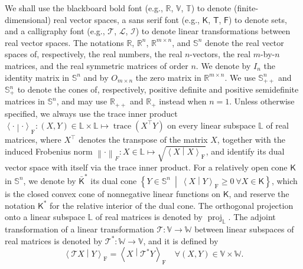 \documentclass[oneside]{amsart}
\theoremstyle{plain}
\theoremstyle{definition}
\theoremstyle{remark}
\numberwithin{equation}{section}
\DeclareMathOperator{\trace}{trace}
\DeclareMathOperator{\proj}{proj}
\begin{document}
We shall use the blackboard bold font (e.g., $\mathbb{R}$, $\mathbb{V}$,
$\mathbb{T}$) to denote (finite-dimensional) real vector spaces, a sans
serif font (e.g., $\mathsf{K}$, $\mathsf{T}$, $\mathsf{F}$) to denote sets,
and a calligraphy font (e.g., $\mathcal{T}$, $\mathcal{L}$, $\mathcal{I}$)
to denote linear transformations between real vector spaces. The notations
$\mathbb{R}$, $\mathbb{R}^{n}$, $\mathbb{R}^{m \times n}$, and
$\mathbb{S}^{n}$ denote the real vector spaces of, respectively, the real
numbers, the real $n$-vectors, the real $m$-by-$n$ matrices, and the real
symmetric matrices of order $n$. We denote by $I_{n}$ the identity matrix
in $\mathbb{S}^{n}$ and by $O_{m \times n}$ the zero matrix in
$\mathbb{R}^{m \times n}$. We use $\mathbb{S}^{n}_{++}$ and
$\mathbb{S}^{n}_{+}$ to denote the cones of, respectively, positive
definite and positive semidefinite matrices in $\mathbb{S}^{n}$, and may
use $\mathbb{R}_{++}$ and $\mathbb{R}_+$ instead when $n = 1$. Unless
otherwise specified, we always use the trace inner product $\left\langle
\cdot \middle| \cdot \right\rangle_{\mathrm{F}} : (X, Y) \in \mathbb{L}
\times \mathbb{L} \mapsto \trace\left( X^{\top} Y \right)$ on every linear
subspace $\mathbb{L}$ of real matrices, where $X^{\top}$ denotes the
transpose of the matrix $X$, together with the induced Frobenius norm
$\left\lVert \cdot\right\rVert_{F} : X \in \mathbb{L} \mapsto
\sqrt{\left\langle X \middle| X \right\rangle_{\mathrm{F}}}$, and identify
its dual vector space with itself via the trace inner product. For a
relatively open cone $\mathsf{K}$ in $\mathbb{S}^{n}$, we denote by
$\bar{\mathsf{K}}^{*}$ its dual cone $\left\{Y \in \mathbb{S}^{n}\
\middle|\ \left\langle X \middle| Y \right\rangle_{\mathrm{F}} \geq 0 \
\forall X \in \mathsf{K}\right\}$, which is the closed convex cone of
nonnegative linear functions on $\mathsf{K}$, and reserve the notation
$\mathsf{K}^{*}$ for the relative interior of the dual cone. The orthogonal
projection onto a linear subspace $\mathbb{L}$ of real matrices is denoted
by $\proj_{\mathbb{L}}$. The adjoint transformation of a linear
transformation $\mathcal{T} : \mathbb{V} \to \mathbb{W}$ between linear
subspaces of real matrices is denoted by $\mathcal{T}^{*} : \mathbb{W} \to
\mathbb{V}$, and it is defined by
\[
\left\langle \mathcal{T} X \middle| Y \right\rangle_{\mathrm{F}} =
\left\langle X \middle| \mathcal{T}^{*} Y \right\rangle_{\mathrm{F}} \quad
\forall (X, Y) \in \mathbb{V} \times \mathbb{W}.
\]

\end{document}
